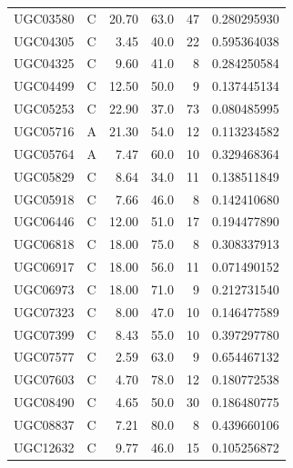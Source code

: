 \documentclass[11pt]{article}
\begin{document}
\begin{longtable}{llrrrr}
UGC03580 & C & 20.70 & 63.0 & 47 & 0.280295930\\
UGC04305 & C & 3.45 & 40.0 & 22 & 0.595364038\\
UGC04325 & C & 9.60 & 41.0 & 8 & 0.284250584\\
UGC04499 & C & 12.50 & 50.0 & 9 & 0.137445134\\
UGC05253 & C & 22.90 & 37.0 & 73 & 0.080485995\\
UGC05716 & A & 21.30 & 54.0 & 12 & 0.113234582\\
UGC05764 & A & 7.47 & 60.0 & 10 & 0.329468364\\
UGC05829 & C & 8.64 & 34.0 & 11 & 0.138511849\\
UGC05918 & C & 7.66 & 46.0 & 8 & 0.142410680\\
UGC06446 & C & 12.00 & 51.0 & 17 & 0.194477890\\
UGC06818 & C & 18.00 & 75.0 & 8 & 0.308337913\\
UGC06917 & C & 18.00 & 56.0 & 11 & 0.071490152\\
UGC06973 & C & 18.00 & 71.0 & 9 & 0.212731540\\
UGC07323 & C & 8.00 & 47.0 & 10 & 0.146477589\\
UGC07399 & C & 8.43 & 55.0 & 10 & 0.397297780\\
UGC07577 & C & 2.59 & 63.0 & 9 & 0.654467132\\
UGC07603 & C & 4.70 & 78.0 & 12 & 0.180772538\\
UGC08490 & C & 4.65 & 50.0 & 30 & 0.186480775\\
UGC08837 & C & 7.21 & 80.0 & 8 & 0.439660106\\
UGC12632 & C & 9.77 & 46.0 & 15 & 0.105256872\\
\bottomrule
\end{longtable}



\end{document}
